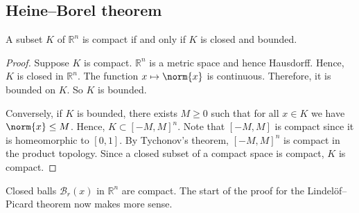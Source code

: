 \subsection{Heine--Borel theorem}
\begin{theorem}
	A subset \( K \) of \( \mathbb R^n \) is compact if and only if \( K \) is closed and bounded.
\end{theorem}
\begin{proof}
	Suppose \( K \) is compact.
	\( \mathbb R^n \) is a metric space and hence Hausdorff.
	Hence, \( K \) is closed in \( \mathbb R^n \).
	The function \( x \mapsto \norm{x} \) is continuous.
	Therefore, it is bounded on \( K \).
	So \( K \) is bounded.

	Conversely, if \( K \) is bounded, there exists \( M \geq 0 \) such that for all \( x \in K \) we have \( \norm{x} \leq M \).
	Hence, \( K \subset [-M, M]^n \).
	Note that \( [-M, M] \) is compact since it is homeomorphic to \( [0,1] \).
	By Tychonov's theorem, \( [-M, M]^n \) is compact in the product topology.
	Since a closed subset of a compact space is compact, \( K \) is compact.
\end{proof}
\begin{example}
	Closed balls \( \mathcal B_r(x) \) in \( \mathbb R^n \) are compact.
	The start of the proof for the Lindel\"of--Picard theorem now makes more sense.
\end{example}

